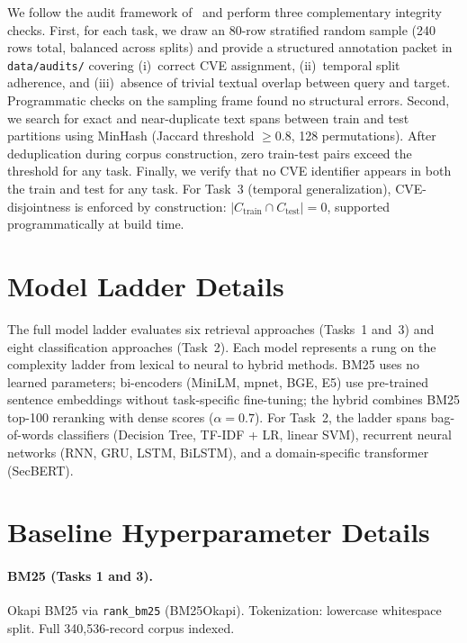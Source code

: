 \documentclass{article}
\begin{document}
We follow the audit framework of~\citet{kapoor2023leakage} and perform three complementary integrity checks. First, for each task, we draw an 80-row stratified random sample (240 rows total, balanced across splits) and provide a structured annotation packet in \texttt{data/audits/} covering (i)~correct CVE assignment, (ii)~temporal split adherence, and (iii)~absence of trivial textual overlap between query and target. Programmatic checks on the sampling frame found no structural errors. Second, we search for exact and near-duplicate text spans between train and test partitions using MinHash (Jaccard threshold $\geq$0.8, 128 permutations). After deduplication during corpus construction, zero train-test pairs exceed the threshold for any task. Finally, we verify that no CVE identifier appears in both the train and test for any task. For Task~3 (temporal generalization), CVE-disjointness is enforced by construction: $|C_{\text{train}} \cap C_{\text{test}}| = 0$, supported programmatically at build time.

\section{Model Ladder Details}
\label{app:model-ladder}

The full model ladder evaluates six retrieval approaches (Tasks~1 and~3) and eight classification approaches (Task~2). Each model represents a rung on the complexity ladder from lexical to neural to hybrid methods. BM25 uses no learned parameters; bi-encoders (MiniLM, mpnet, BGE, E5) use pre-trained sentence embeddings without task-specific fine-tuning; the hybrid combines BM25 top-100 reranking with dense scores ($\alpha{=}0.7$). For Task~2, the ladder spans bag-of-words classifiers (Decision Tree, TF-IDF + LR, linear SVM), recurrent neural networks (RNN, GRU, LSTM, BiLSTM), and a domain-specific transformer (SecBERT).

\section{Baseline Hyperparameter Details}
\label{app:hyperparams}

\paragraph{BM25 (Tasks 1 and 3).} 
Okapi BM25 via \texttt{rank\_bm25} (BM25Okapi). Tokenization: lowercase whitespace split. Full 340,536-record corpus indexed.
\end{document}
